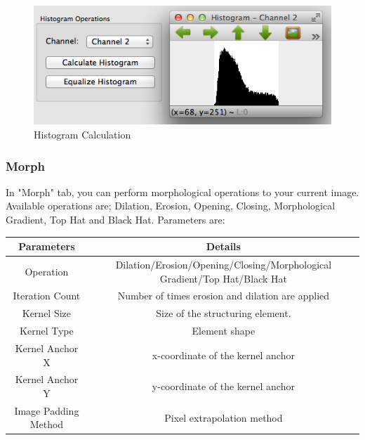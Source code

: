 \documentclass{article}
\begin{document}
\begin{figure}[H]
\begin{center}
\includegraphics[scale=0.8]{toolboxHistogram.png}
\caption{Histogram Calculation}
\end{center}
\end{figure}	

\subsubsection{Morph}

In "Morph" tab, you can perform morphological operations to your current image. Available operations are; Dilation, Erosion, Opening, Closing, Morphological Gradient, Top Hat and Black Hat. Parameters are:

\begin{table}[H]
\begin{center}
\begin{tabular}{|c|c|l|l|l|}
\hline
\textbf{Parameters}  & \multicolumn{4}{|c|}{\textbf{Details}}                                                          \\ \hline
Operation            & \multicolumn{4}{|c|}{Dilation/Erosion/Opening/Closing/Morphological Gradient/Top Hat/Black Hat} \\ \hline
Iteration Count      & \multicolumn{4}{|c|}{Number of times erosion and dilation are applied}                          \\ \hline
Kernel Size          & \multicolumn{4}{|c|}{Size of the structuring element.}                                          \\ \hline
Kernel Type          & \multicolumn{4}{|c|}{Element shape}                                                             \\ \hline
Kernel Anchor X      & \multicolumn{4}{|c|}{x-coordinate of the kernel anchor}                                         \\ \hline
Kernel Anchor Y      & \multicolumn{4}{|c|}{y-coordinate of the kernel anchor}                                         \\ \hline
Image Padding Method & \multicolumn{4}{|c|}{Pixel extrapolation method}                                                \\ \hline
\end{tabular}
\end{center}
\end{table}
\end{document}
